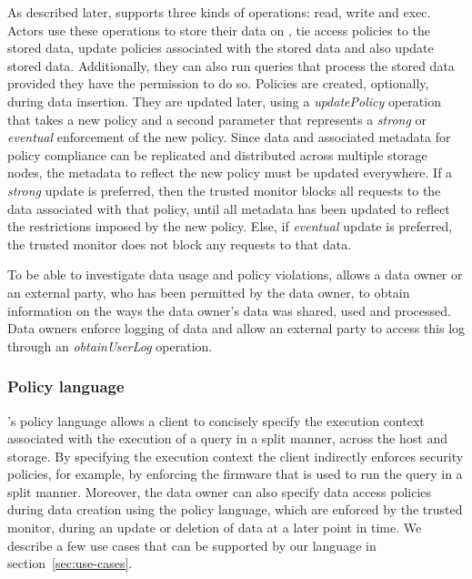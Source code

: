 As described later, \project{} supports three kinds of operations: read, write and exec. Actors use these operations to store their data on \project{}, tie access policies to the stored data, update policies associated with the stored data and also update stored data. Additionally, they can also run queries that process the stored data provided they have the permission to do so. Policies are created, optionally, during data insertion. They are updated later, using a \emph{updatePolicy} operation that takes a new policy and a second parameter that represents a \emph{strong} or \emph{eventual} enforcement of the new policy. Since data and associated metadata for policy compliance can be replicated and distributed across multiple storage nodes, the metadata to reflect the new policy must be updated everywhere. If a \emph{strong} update is preferred, then the trusted monitor blocks all requests to the data associated with that policy, until all metadata has been updated to reflect the restrictions imposed by the new policy. Else, if \emph{eventual} update is preferred, the trusted monitor does not block any requests to that data.

To be able to investigate data usage and policy violations, \project{} allows a data owner or an external party, who has been permitted by the data owner, to obtain information on the ways the data owner's data was shared, used and processed. Data owners enforce logging of data and allow an external party to access this log through an \emph{obtainUserLog} operation.

\subsubsection{Policy language}


\project{}'s policy language allows a client to concisely specify the execution context associated with the execution of a query in a split manner, across the host and storage. By specifying the execution context the client indirectly enforces security policies, for example, by enforcing the firmware that is used to run the query in a split manner. Moreover, the data owner can also specify data access policies during data creation using the policy language, which are enforced by the trusted monitor, during an update or deletion of data at a later point in time. We describe a few use cases that can be supported by our language in section~\ref{sec:use-cases}.

